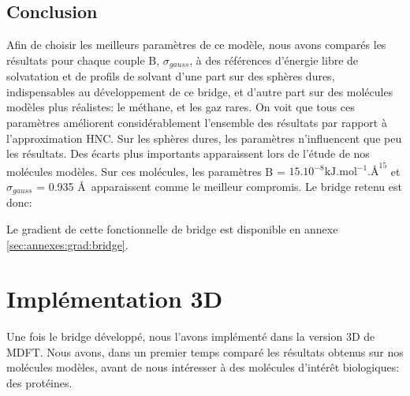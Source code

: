 \subsection{Conclusion}
Afin de choisir les meilleurs paramètres de ce modèle, nous avons comparés les résultats pour chaque couple B, $\sigma_{gauss}$, à des références d'énergie libre de solvatation et de profils de solvant d'une part sur des sphères dures, indispensables au développement de ce bridge, et d'autre part sur des molécules modèles plus réalistes: le méthane, et les gaz rares.
On voit que tous ces paramètres améliorent considérablement l'ensemble des résultats par rapport à l'approximation HNC. Sur les sphères dures, les paramètres n'influencent que peu les résultats. Des écarts plus importants apparaissent lors de l'étude de nos molécules modèles. Sur ces molécules, les paramètres B = $15.10^{-8} \mathrm{kJ.mol}^{-1}.\text{\AA}^{15}$ et $\sigma_{gauss}$ = 0.935 \AA\ apparaissent comme le meilleur compromis. Le bridge retenu est donc:


Le gradient de cette fonctionnelle de bridge est disponible en annexe \ref{sec:annexes:grad:bridge}.

\section{Implémentation 3D}
Une fois le bridge développé, nous l'avons implémenté dans la version 3D de MDFT. Nous avons, dans un premier temps comparé les résultats obtenus sur nos molécules modèles, avant de nous intéresser à des molécules d’intérêt biologiques: des protéines.


